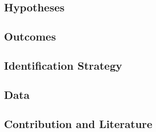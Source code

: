 \documentclass[]{article}
\begin{document}
\hypertarget{hypotheses-2}{%
\subsection{Hypotheses}\label{hypotheses-2}}

\hypertarget{outcomes-2}{%
\subsection{Outcomes}\label{outcomes-2}}

\hypertarget{identification-strategy-2}{%
\subsection{Identification Strategy}\label{identification-strategy-2}}

\hypertarget{data-2}{%
\subsection{Data}\label{data-2}}

\hypertarget{contribution-and-literature-2}{%
\subsection{Contribution and
Literature}\label{contribution-and-literature-2}}
\end{document}
